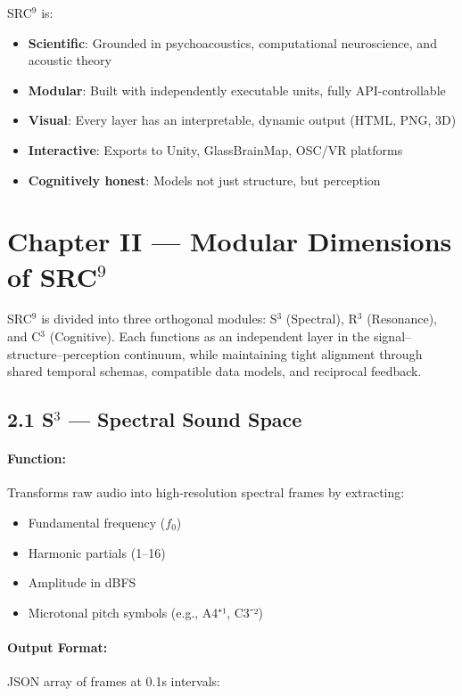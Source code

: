 \documentclass[10pt]{article}
\begin{document}
SRC$^{9}$ is:

\begin{itemize}
    \item \textbf{Scientific}: Grounded in psychoacoustics, computational neuroscience, and acoustic theory
    \item \textbf{Modular}: Built with independently executable units, fully API-controllable
    \item \textbf{Visual}: Every layer has an interpretable, dynamic output (HTML, PNG, 3D)
    \item \textbf{Interactive}: Exports to Unity, GlassBrainMap, OSC/VR platforms
    \item \textbf{Cognitively honest}: Models not just structure, but perception
\end{itemize}

\section*{Chapter II — Modular Dimensions of SRC$^{9}$}

SRC$^{9}$ is divided into three orthogonal modules: S$^{3}$ (Spectral), R$^{3}$ (Resonance), and C$^{3}$ (Cognitive). Each functions as an independent layer in the signal–structure–perception continuum, while maintaining tight alignment through shared temporal schemas, compatible data models, and reciprocal feedback.

\subsection*{2.1 S$^{3}$ — Spectral Sound Space}

\paragraph{Function:}  
Transforms raw audio into high-resolution spectral frames by extracting:

\begin{itemize}
  \item Fundamental frequency ($f_0$)
  \item Harmonic partials (1–16)
  \item Amplitude in dBFS
  \item Microtonal pitch symbols (e.g., A4⁺¹, C3⁻²)
\end{itemize}

\paragraph{Output Format:}  
JSON array of frames at 0.1s intervals:
\end{document}
